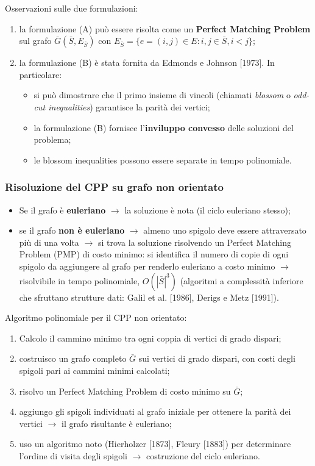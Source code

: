 Osservazioni sulle due formulazioni:
\begin{enumerate}
	\item la formulazione (A) può essere risolta come un \textbf{Perfect Matching Problem} sul grafo $\bar{G}(\bar{S},E_{\bar{S}})$ con $E_{\bar{S}}=\{e=(i,j)\in E:i,j\in \bar{S},i<j\}$;
	\item la formulazione (B) è stata fornita da Edmonds e Johnson [1973]. In particolare:
	\begin{itemize}
		\item si può dimostrare che il primo insieme di vincoli (chiamati \textit{blossom} o \textit{odd-cut inequalities}) garantisce la parità dei vertici;
		\item la formulazione (B) fornisce l'\textbf{inviluppo convesso} delle soluzioni del problema;
		\item le blossom inequalities possono essere separate in tempo polinomiale.
	\end{itemize}
\end{enumerate}

\subsubsection*{Risoluzione del CPP su grafo non orientato}
\begin{itemize}
	\item Se il grafo è \textbf{euleriano} $\rightarrow$ la soluzione è nota (il ciclo euleriano stesso);
	\item se il grafo \textbf{non è euleriano} $\rightarrow$ almeno uno spigolo deve essere attraversato più di una volta $\rightarrow$ si trova la soluzione risolvendo un Perfect Matching Problem (PMP) di costo minimo: si identifica il numero di copie di ogni spigolo da aggiungere al grafo per renderlo euleriano a costo minimo $\rightarrow$ risolvibile in tempo polinomiale, $O(|\bar{S}|^3)$ (algoritmi a complessità inferiore che sfruttano strutture dati: Galil et al. [1986], Derigs e Metz [1991]).
\end{itemize}

Algoritmo polinomiale per il CPP non orientato:
\begin{enumerate}
	\item Calcolo il cammino minimo tra ogni coppia di vertici di grado dispari;
	\item costruisco un grafo completo $\bar{G}$ sui vertici di grado dispari, con costi degli spigoli pari ai cammini minimi calcolati;
	\item risolvo un Perfect Matching Problem di costo minimo su $\bar{G}$;
	\item aggiungo gli spigoli individuati al grafo iniziale per ottenere la parità dei vertici $\rightarrow$ il grafo risultante è euleriano;
	\item uso un algoritmo noto (Hierholzer [1873], Fleury [1883]) per determinare l'ordine di visita degli spigoli $\rightarrow$ costruzione del ciclo euleriano.
\end{enumerate}

